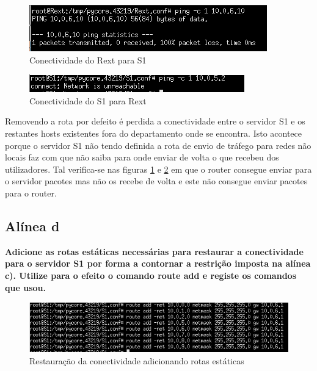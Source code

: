 \documentclass[a4paper]{report}
\begin{document}
\begin{figure}[H]
    \centering 
    \includegraphics[width=\textwidth]{images/pingRextS1.png}
    \caption{Conectividade do Rext para S1}
    \label{fig:pingRextS1}
\end{figure}

\begin{figure}[H]
    \centering 
    \includegraphics[width=\textwidth]{images/pingS1Rext.png}
    \caption{Conectividade do S1 para Rext}
    \label{fig:pingS1Rext}
\end{figure}

Removendo a rota por defeito é perdida a conectividade entre o servidor S1 e os 
restantes hosts existentes fora do departamento onde se encontra. Isto acontece porque o 
servidor S1 não tendo definida a rota de envio de tráfego para redes não locais faz com 
que não saiba para onde enviar de volta o que recebeu dos utilizadores. Tal verifica-se
nas figuras \ref{fig:pingRextS1} e \ref{fig:pingS1Rext} em que o router consegue enviar
para o servidor pacotes mas não os recebe de volta e este não consegue enviar
pacotes para o router.

\subsection{Alínea d}
\textbf{Adicione as rotas estáticas necessárias para restaurar a conectividade
para o servidor S1 por forma a contornar a restrição imposta na alínea c).
Utilize para o efeito o comando route add e registe os comandos que usou.}

\begin{figure}[H]
    \centering 
    \includegraphics[width=\textwidth]{images/routeAdd.png}
    \caption{Restauração da conectividade adicionando rotas estáticas}
    \label{fig:routeAdd}
\end{figure}
\end{document}
